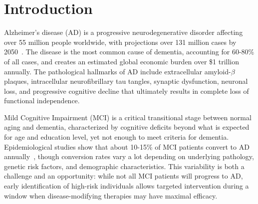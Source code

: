 \documentclass[blue]{ludusofficial}  %
\begin{document}

\maketitle

\section{Introduction}

Alzheimer's disease (AD) is a progressive neurodegenerative disorder affecting over 55 million people worldwide, with projections over 131 million cases by 2050~\cite{hafeez2024deep}. The disease is the most common cause of dementia, accounting for 60-80\% of all cases, and creates an estimated global economic burden over \$1 trillion annually. The pathological hallmarks of AD include extracellular amyloid-$\beta$ plaques, intracellular neurofibrillary tau tangles, synaptic dysfunction, neuronal loss, and progressive cognitive decline that ultimately results in complete loss of functional independence.

Mild Cognitive Impairment (MCI) is a critical transitional stage between normal aging and dementia, characterized by cognitive deficits beyond what is expected for age and education level, yet not enough to meet criteria for dementia. Epidemiological studies show that about 10-15\% of MCI patients convert to AD annually~\cite{li2021predicting}, though conversion rates vary a lot depending on underlying pathology, genetic risk factors, and demographic characteristics. This variability is both a challenge and an opportunity: while not all MCI patients will progress to AD, early identification of high-risk individuals allows targeted intervention during a window when disease-modifying therapies may have maximal efficacy.
\end{document}
